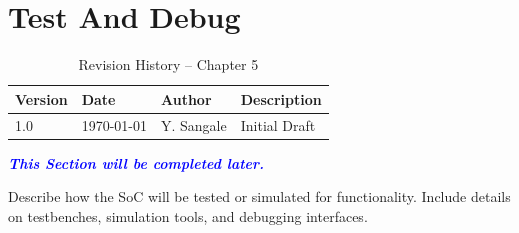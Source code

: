 \chapter{Test And Debug}

\begin{table}[H]
\caption{Revision History – Chapter 5}
\centering
\begin{tabular}{llll}
\toprule
Version & Date & Author & Description \\
\midrule
1.0 & \today & Y. Sangale & Initial Draft \\
\bottomrule
\end{tabular}
\end{table}

\textcolor{blue}{\textbf{\textit{This Section will be completed later.}}}

Describe how the SoC will be tested or simulated for functionality. Include details on testbenches, simulation tools, and debugging interfaces. 